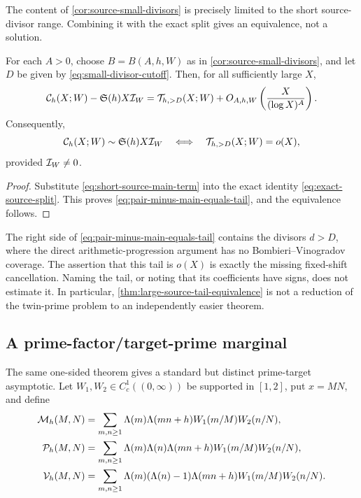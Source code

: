 The content of \cref{cor:source-small-divisors} is precisely limited
to the short source-divisor range.  Combining it with the exact split gives
an equivalence, not a solution.

\begin{theorem}
\label{thm:large-source-tail-equivalence}
For each $A>0$, choose $B=B(A,h,W)$ as in
\cref{cor:source-small-divisors}, and let $D$ be given by
\eqref{eq:small-divisor-cutoff}.  Then, for all sufficiently large $X$,
\begin{equation}\label{eq:pair-minus-main-equals-tail}
 \mathcal C_h(X;W)-\mathfrak S(h)X\mathcal I_W
 =\mathcal T_{h,>D}(X;W)
  +O_{A,h,W}\left(\frac{X}{(\log X)^A}\right).
\end{equation}
Consequently,
\begin{equation}\label{eq:tail-equivalence-asymptotic}
 \mathcal C_h(X;W)\sim\mathfrak S(h)X\mathcal I_W
 \quad\Longleftrightarrow\quad
 \mathcal T_{h,>D}(X;W)=o(X),
\end{equation}
provided $\mathcal I_W\ne0$.
\end{theorem}

\begin{proof}
Substitute \eqref{eq:short-source-main-term} into the exact identity
\eqref{eq:exact-source-split}.  This proves
\eqref{eq:pair-minus-main-equals-tail}, and the equivalence follows.
\end{proof}

\begin{remark}
\label{rem:small-divisor-tail-boundary}
The right side of \eqref{eq:pair-minus-main-equals-tail} contains the
divisors $d>D$, where the direct arithmetic-progression argument has no
Bombieri--Vinogradov coverage.  The assertion that this tail is $o(X)$ is
exactly the missing fixed-shift cancellation.  Naming the tail, or noting
that its coefficients have signs, does not estimate it.  In particular,
\cref{thm:large-source-tail-equivalence} is not a reduction of the twin-prime
problem to an independently easier theorem.
\end{remark}

\subsection{A prime-factor/target-prime marginal}
\label{subsec:prime-target-marginal}

The same one-sided theorem gives a standard but distinct prime-target
asymptotic.  Let $W_1,W_2\in C_c^1((0,\infty))$ be supported in $[1,2]$,
put $x=MN$, and define
\begin{align}
 \mathcal M_h(M,N)
 &=\sum_{m,n\geq1}
   \Lambda(m)\Lambda(mn+h)
   W_1(m/M)W_2(n/N),
 \label{eq:prime-target-marginal}\\
 \mathcal P_h(M,N)
 &=\sum_{m,n\geq1}
   \Lambda(m)\Lambda(n)\Lambda(mn+h)
   W_1(m/M)W_2(n/N),
 \label{eq:three-prime-target-form}\\
 \mathcal V_h(M,N)
 &=\sum_{m,n\geq1}
   \Lambda(m)(\Lambda(n)-1)\Lambda(mn+h)
   W_1(m/M)W_2(n/N).
 \label{eq:missing-prime-covariance}
\end{align}

